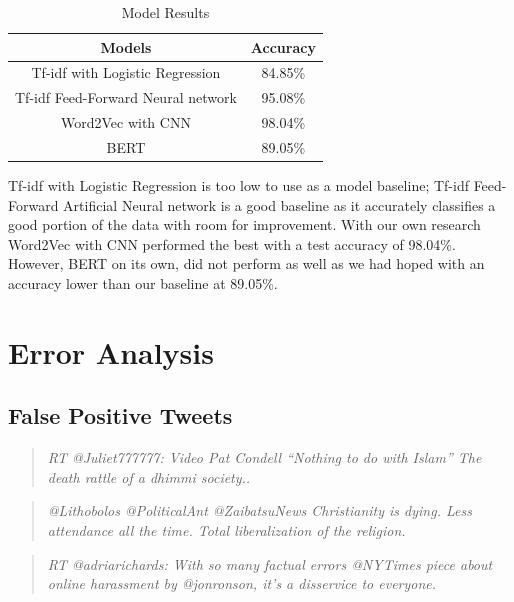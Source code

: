 \documentclass[conference]{IEEEtran}
\begin{document}
\begin{table}[htbp]
\caption{Model Results}
\begin{center}
\begin{tabular}{|c|l|l|l|l|l|l|c|l|l|}
\hline
\multicolumn{7}{|c|}{\textbf{Models}}    & \multicolumn{3}{c|}{\textbf{Accuracy}} \\ \hline
\multicolumn{7}{|c|}{Tf-idf with Logistic Regression}  & \multicolumn{3}{c|}{84.85\%}     \\ \hline
\multicolumn{7}{|c|}{Tf-idf Feed-Forward Neural network} & \multicolumn{3}{c|}{95.08\%}     \\ \hline
\multicolumn{7}{|c|}{Word2Vec with CNN}   & \multicolumn{3}{c|}{98.04\%}     \\ \hline
\multicolumn{7}{|c|}{BERT}      & \multicolumn{3}{c|}{89.05\%}     \\ \hline
\end{tabular}
\label{tab1}
\end{center}
\end{table}

Tf-idf with Logistic Regression is too low to use as a model baseline; Tf-idf Feed-Forward Artificial Neural network is a good baseline as it accurately classifies a good portion of the data with room for improvement. With our own research Word2Vec with CNN performed the best with a test accuracy of 98.04\%. However, BERT on its own, did not perform as well as we had hoped with an accuracy lower than our baseline at 89.05\%. 


\section{Error Analysis}

\subsection{False Positive Tweets}
\begin{quotation}
\emph{RT @Juliet777777: Video Pat Condell “Nothing to do with Islam” The death rattle of a dhimmi society..}
\end{quotation}
\begin{quotation}
\emph{@Lithobolos @PoliticalAnt @ZaibatsuNews Christianity is dying.  Less attendance all the time. Total liberalization of the religion.}
\end{quotation}
\begin{quotation}
\emph{RT @adriarichards: With so many factual errors @NYTimes piece about online harassment by @jonronson, it's a disservice to everyone.}
\end{quotation}
\end{document}
